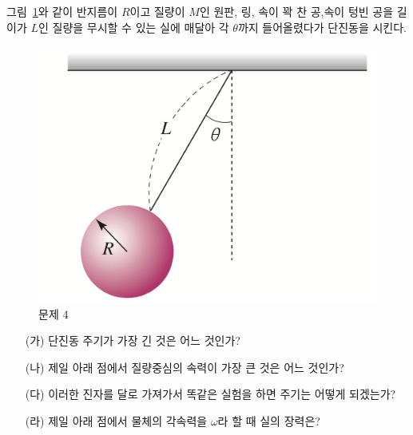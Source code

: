 \documentclass[floatfix,nofootinbib,superscriptaddress,fleqn]{revtex4-2}
\begin{document}
 \vspace{1.cm}
그림~\ref{fig:4}와 같이 반지름이 $R$이고 질량이 $M$인 원판, 링, 속이
꽉 찬 공,속이 텅빈 공을 길이가 $L$인 질량을 무시할 수 있는 실에 매달아
각 $\theta$까지 들어올렸다가 단진동을 시킨다. 
\begin{figure}[ht]
  \centering
\includegraphics[scale=0.25]{Qfig17-4-20220509.png}
  \caption{문제 4}
  \label{fig:4}
\end{figure}
\begin{itemize}
\item[(가)] 단진동 주기가 가장 긴 것은 어느 것인가?
\item[(나)] 제일 아래 점에서 질량중심의 속력이 가장 큰 것은 어느 것인가?
\item[(다)] 이러한 진자를 달로 가져가서 똑같은 실험을 하면 주기는
  어떻게 되겠는가?
\item[(라)] 제일 아래 점에서 물체의 각속력을 $\omega$라 할 때 실의 장력은? 
\end{itemize}
\end{document}

